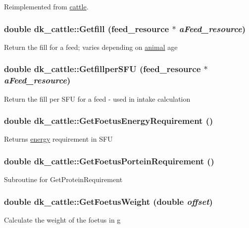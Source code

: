 Reimplemented from \hyperlink{classcattle_a8c3fee12050228b91b4f8a6aeeaae178}{cattle}.\hypertarget{classdk__cattle_ac50acadef7f16e7fac68bd89e6ca9836}{
\subsubsection[{Getfill}]{\setlength{\rightskip}{0pt plus 5cm}double dk\_\-cattle::Getfill ({\bf feed\_\-resource} $\ast$ {\em aFeed\_\-resource})}}
\label{classdk__cattle_ac50acadef7f16e7fac68bd89e6ca9836}
Return the fill for a feed; varies depending on \hyperlink{classanimal}{animal} age \hypertarget{classdk__cattle_aa8a00543f57092882c1cbc9949ca453c}{
\subsubsection[{GetfillperSFU}]{\setlength{\rightskip}{0pt plus 5cm}double dk\_\-cattle::GetfillperSFU ({\bf feed\_\-resource} $\ast$ {\em aFeed\_\-resource})}}
\label{classdk__cattle_aa8a00543f57092882c1cbc9949ca453c}
Return the fill per SFU for a feed -\/ used in intake calculation \hypertarget{classdk__cattle_a704850ee7a8dbc5637f87c1de6a2fdf5}{
\subsubsection[{GetFoetusEnergyRequirement}]{\setlength{\rightskip}{0pt plus 5cm}double dk\_\-cattle::GetFoetusEnergyRequirement ()}}
\label{classdk__cattle_a704850ee7a8dbc5637f87c1de6a2fdf5}
Returns \hyperlink{classenergy}{energy} requirement in SFU \hypertarget{classdk__cattle_a0c08a3cb85354d4ae2bfb57b1d06a7fe}{
\subsubsection[{GetFoetusPorteinRequirement}]{\setlength{\rightskip}{0pt plus 5cm}double dk\_\-cattle::GetFoetusPorteinRequirement ()}}
\label{classdk__cattle_a0c08a3cb85354d4ae2bfb57b1d06a7fe}
Subroutine for GetProteinRequirement \hypertarget{classdk__cattle_a360aab1d0df345d99791e00292999a94}{
\subsubsection[{GetFoetusWeight}]{\setlength{\rightskip}{0pt plus 5cm}double dk\_\-cattle::GetFoetusWeight (double {\em offset})}}
\label{classdk__cattle_a360aab1d0df345d99791e00292999a94}
Calculate the weight of the foetus in g 

